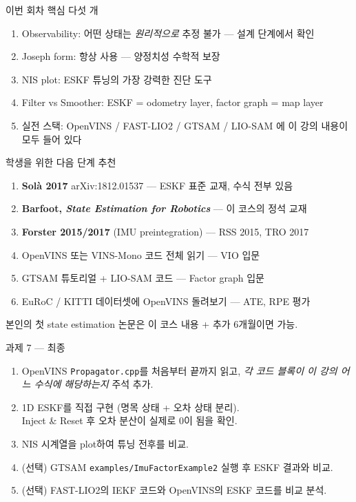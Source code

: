 \begin{frame}{이번 회차 핵심 다섯 개}
  \begin{enumerate}
    \item Observability: 어떤 상태는 \emph{원리적으로} 추정 불가 — 설계 단계에서 확인
    \item Joseph form: 항상 사용 — 양정치성 수학적 보장
    \item NIS plot: ESKF 튜닝의 가장 강력한 진단 도구
    \item Filter vs Smoother: ESKF = odometry layer, factor graph = map layer
    \item 실전 스택: OpenVINS / FAST-LIO2 / GTSAM / LIO-SAM 에 이 강의 내용이 모두 들어 있다
  \end{enumerate}
\end{frame}

\begin{frame}{학생을 위한 다음 단계 추천}
  \begin{enumerate}
    \item \textbf{Solà 2017} arXiv:1812.01537 — ESKF 표준 교재, 수식 전부 있음
    \item \textbf{Barfoot, \emph{State Estimation for Robotics}} — 이 코스의 정석 교재
    \item \textbf{Forster 2015/2017} (IMU preintegration) — RSS 2015, TRO 2017
    \item OpenVINS 또는 VINS-Mono 코드 전체 읽기 — VIO 입문
    \item GTSAM 튜토리얼 + LIO-SAM 코드 — Factor graph 입문
    \item EuRoC / KITTI 데이터셋에 OpenVINS 돌려보기 — ATE, RPE 평가
  \end{enumerate}
  \pause
  \vspace{0.3em}
  본인의 첫 state estimation 논문은 이 코스 내용 + 추가 6개월이면 가능.
\end{frame}

\begin{frame}{과제 7 — 최종}
  \begin{enumerate}
    \item OpenVINS \texttt{Propagator.cpp}를 처음부터 끝까지 읽고,
          \emph{각 코드 블록이 이 강의 어느 수식에 해당하는지} 주석 추가.
    \item 1D ESKF를 직접 구현 (명목 상태 + 오차 상태 분리).\\
          Inject \& Reset 후 오차 분산이 실제로 0이 됨을 확인.
    \item NIS 시계열을 plot하여 튜닝 전후를 비교.
    \item (선택) GTSAM \texttt{examples/ImuFactorExample2} 실행 후 ESKF 결과와 비교.
    \item (선택) FAST-LIO2의 IEKF 코드와 OpenVINS의 ESKF 코드를 비교 분석.
  \end{enumerate}
\end{frame}

